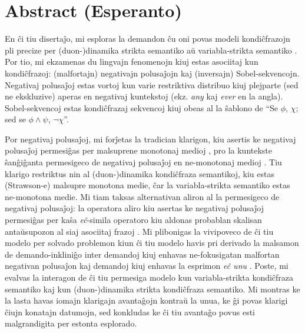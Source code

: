 \cleardoublepage
\section*{Abstract (Esperanto)}%
\begin{otherlanguage}{esperanto}
En ĉi tiu disertaĵo, mi esploras la demandon ĉu oni povas modeli kondiĉfrazojn pli precize per (duon-)dinamika strikta semantiko \parencite{Fintel2001,Gillies2007} aŭ variabla-strikta semantiko \parencite{Stalnaker1968,Lewis1973}. Por tio, mi ekzamenas du lingvajn fenomenojn kiuj estas asociitaj kun kondiĉfrazoj: (malfortajn) negativajn polusaĵojn kaj (inversajn) Sobel-sekvencojn. Negativaj polusaĵoj estas vortoj kun varie restriktiva distribuo kiuj plejparte (sed ne ekskluzive) aperas en negativaj kuntekstoj (ekz. \textit{any} kaj \textit{ever} en la angla). Sobel-sekvencoj estas kondiĉfrazaj sekvencoj kiuj obeas al la ŝablono de \enquote{Se $\phi$, $\chi$; sed se $\phi\land\psi$, $\neg\chi$}.

Por negativaj polusaĵoj, mi forĵetas la tradician klarigon, kiu asertis ke negativaj polusaĵoj permesiĝas per malsuprene monotonaj medioj \parencite{Fauconnier1975a,Fauconnier1975b,Ladusaw1980}, pro la kuntekste ŝanĝiĝanta permesigeco de negativaj polusaĵoj en ne-monotonaj medioj \parencite{Crnic2011}. Tiu klarigo restriktus nin al (duon-)dinamika kondiĉfraza semantikoj, kiu estas (Strawson-e) malsupre monotona medie, ĉar la variabla-strikta semantiko estas ne-monotona medie. Mi tiam taksas alternativan aliron al la permesigeco de negativaj polusaĵoj: la operatora aliro kiu asertas ke negativaj polusaĵoj permesiĝas per kaŝa \textit{eĉ}-simila operatoro kiu aldonas probablan skalisan antaŭsupozon al siaj asociitaj frazoj \parencite[vidu, inter aliajn,][]{Crnic2014-dogma,Crnic2014-nm}. Mi plibonigas la vivipoveco de ĉi tiu modelo per solvado problemon kiun ĉi tiu modelo havis pri derivado la malsamon de demando-inkliniĝo inter demandoj kiuj enhavas ne-fokusigatan malfortan negativan polusaĵon kaj demandoj kiuj enhavas la esprimon \textit{eĉ unu} \parencite[vidu, inter aliajn,][]{Crnic2014-dogma,Crnic2014-nm,Krassnig2018,Jeong2021,Jeong2022}. Poste, mi evalvas la interagon de ĉi tiu permesiga modelo kun variabla-strikta kondiĉfraza semantiko kaj kun (duon-)dinamika strikta kondiĉfraza semantiko. Mi montras ke la lasta havas iomajn klarigajn avantaĝojn kontraŭ la unua, ke ĝi povas klarigi ĉiujn konatajn datumojn, sed konkludas ke ĉi tiu avantaĝo povus esti malgrandigita per estonta esplorado.
    

\end{otherlanguage}
